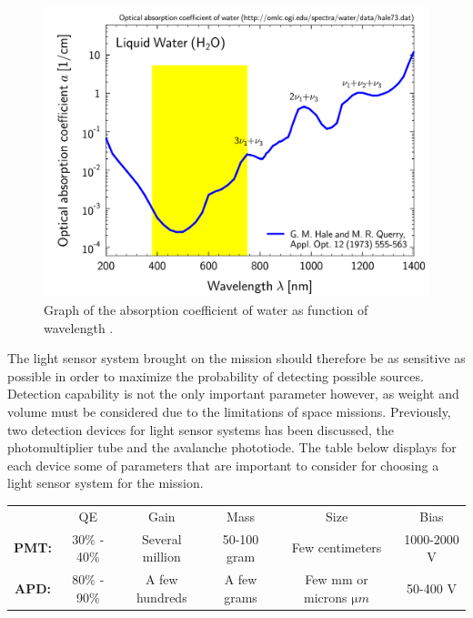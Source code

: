 \begin{figure}[htb]
\begin{center}
\includegraphics[scale=0.8]{figures/RCS/absorption_watef}
\caption{Graph of the absorption coefficient of water as function of wavelength \cite{water_abs}.}
\label{fig:water_abs}
\end{center}
\end{figure}

The light sensor system brought on the mission should therefore be as sensitive as possible in order to maximize the probability of detecting possible sources. Detection capability is not the only important parameter however, as weight and volume must be considered due to the limitations of space missions. Previously, two detection devices for light sensor systems has been discussed, the photomultiplier tube and the avalanche phototiode. The table below displays for each device some of parameters that are important to consider for choosing a light sensor system for the mission.\
	
\begin{center}
\begin{tabular}{ |c|c|c|c|c|c| } 
 \hline
               & QE & Gain & Mass & Size & Bias \\
 \textbf{PMT:} & 30\% - 40\% & Several million & 50-100 gram & Few centimeters & 1000-2000 V \\ 
 \textbf{APD:} & 80\% - 90\% & A few hundreds & A few grams  & Few mm or microns $\mathrm{\mu}m$ & 50-400 V \\
 \hline
\end{tabular}
\end{center}
	
